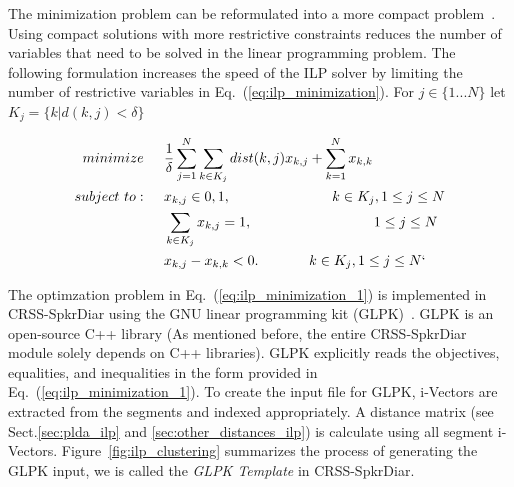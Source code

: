 The minimization problem can be reformulated into a more compact problem~\cite{dupuy2014ILPimprovement}. 
Using compact solutions with more restrictive constraints reduces the number of variables that need to be solved in the linear programming problem. 
The following formulation increases the speed of the ILP solver by limiting the number of restrictive variables in Eq.~(\ref{eq:ilp_minimization}). For $j \in \{1 ... N\}$ let $K_j = \{k | d(k,j) < \delta\}$ 




\begin{equation}
\label{eq:ilp_minimization_1}
\begin{split}
minimize \hspace{0.2in}& \frac{1}{\delta}\sum\limits_{j=1}^{N}\sum\limits_{k\in K_j}dist(k,j)x_{k,j} + \sum\limits_{k=1}^{N}x_{k,k} \\
subject~to:  \hspace{0.2in}& x_{k,j} \in {0,1}, \hspace{1in} k \in K_j , 1 \leq j \leq N \\
 & \sum\limits_{k\in K_j}x_{k,j} = 1, \hspace{1.2in} 1 \leq j \leq N \\
 & x_{k,j} - x_{k,k} < 0. \hspace{0.5in} k \in K_j , 1 \leq j \leq N`
\end{split}
\end{equation}

The optimzation problem in Eq.~(\ref{eq:ilp_minimization_1}) is implemented in CRSS-SpkrDiar using the GNU linear programming kit (GLPK)~\cite{makhorin2008glpk}. GLPK is an open-source C++ library (As mentioned before, the entire CRSS-SpkrDiar module solely depends on C++ libraries). 
GLPK explicitly reads the objectives, equalities, and inequalities in the form provided in Eq.~(\ref{eq:ilp_minimization_1}). 
To create the input file for GLPK, i-Vectors are extracted from the segments and indexed appropriately. 
A distance matrix (see Sect.\ref{sec:plda_ilp} and \ref{sec:other_distances_ilp}) is calculate using all segment i-Vectors. 
Figure~\ref{fig:ilp_clustering} summarizes the process of generating the GLPK input, we is called the {\it GLPK Template} in CRSS-SpkrDiar. 

